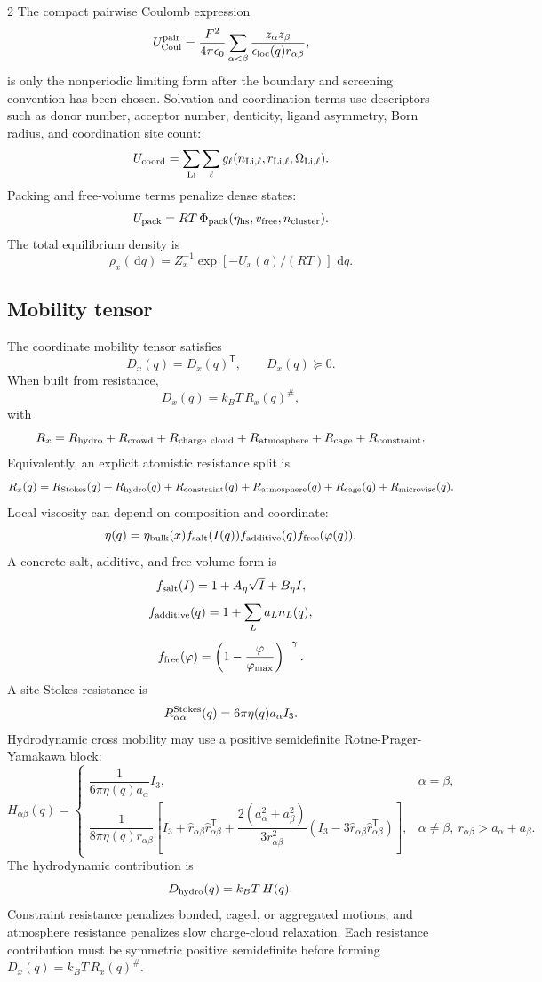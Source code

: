\documentclass[10pt]{article}
\newcommand{\dd}{\,\mathrm d}
\newcommand{\T}{\mathsf{T}}
\begin{document}
\begin{multicols}{2}
The compact pairwise Coulomb expression
\[
U_{\rm Coul}^{\rm pair}
=
\frac{F^2}{4\pi\epsilon_0}
\sum_{\alpha<\beta}
\frac{z_\alpha z_\beta}{\epsilon_{\rm loc}(q)r_{\alpha\beta}},
\]
is only the nonperiodic limiting form after the boundary and screening
convention has been chosen.
Solvation and coordination terms use descriptors such as donor number,
acceptor number, denticity, ligand asymmetry, Born radius, and coordination
site count:
\[
U_{\rm coord}
=
\sum_{\rm Li}\sum_{\ell}
g_\ell(n_{\rm Li,\ell},r_{\rm Li,\ell},\Omega_{\rm Li,\ell}).
\]
Packing and free-volume terms penalize dense states:
\[
U_{\rm pack}=RT\,\Phi_{\rm pack}(\eta_{\rm hs},v_{\rm free},n_{\rm cluster}).
\]
The total equilibrium density is
\[
\rho_x(\dd q)
=
Z_x^{-1}\exp[-U_x(q)/(RT)]\,\dd q.
\]

\subsection{Mobility tensor}
\label{sec:mobility}

The coordinate mobility tensor satisfies
\[
D_x(q)=D_x(q)^\T,\qquad D_x(q)\succeq0.
\]
When built from resistance,
\[
D_x(q)=k_BT\,R_x(q)^\#,
\]
with
\[
R_x=
R_{\rm hydro}
+
R_{\rm crowd}
+
R_{\rm charge\ cloud}
+
R_{\rm atmosphere}
+
R_{\rm cage}
+
R_{\rm constraint}.
\]
Equivalently, an explicit atomistic resistance split is
\[
R_x(q)
=
R_{\rm Stokes}(q)
+
R_{\rm hydro}(q)
+
R_{\rm constraint}(q)
+
R_{\rm atmosphere}(q)
+
R_{\rm cage}(q)
+
R_{\rm microvisc}(q).
\]
Local viscosity can depend on composition and coordinate:
\[
\eta(q)
=
\eta_{\rm bulk}(x)
f_{\rm salt}(I(q))
f_{\rm additive}(q)
f_{\rm free}( \varphi(q)).
\]
A concrete salt, additive, and free-volume form is
\[
f_{\rm salt}(I)
=
1+A_\eta\sqrt I+B_\eta I,
\]
\[
f_{\rm additive}(q)
=
1+\sum_L a_L n_L(q),
\]
\[
f_{\rm free}(\varphi)
=
\left(1-\frac{\varphi}{\varphi_{\max}}\right)^{-\gamma}.
\]
A site Stokes resistance is
\[
R_{\alpha\alpha}^{\rm Stokes}(q)
=
6\pi\eta(q)a_\alpha I_3.
\]
Hydrodynamic cross mobility may use a positive semidefinite Rotne-Prager-Yamakawa
block:
\[
H_{\alpha\beta}(q)
=
\begin{cases}
\dfrac{1}{6\pi\eta(q)a_\alpha}I_3,
& \alpha=\beta,\\[7pt]
\dfrac{1}{8\pi\eta(q)r_{\alpha\beta}}
\left[
I_3+\hat r_{\alpha\beta}\hat r_{\alpha\beta}^{\T}
+
\dfrac{2(a_\alpha^2+a_\beta^2)}{3r_{\alpha\beta}^2}
\left(
I_3-3\hat r_{\alpha\beta}\hat r_{\alpha\beta}^{\T}
\right)
\right],
& \alpha\ne\beta,\ r_{\alpha\beta}>a_\alpha+a_\beta.
\end{cases}
\]
The hydrodynamic contribution is
\[
D_{\rm hydro}(q)=k_BT\,H(q).
\]
Constraint resistance penalizes bonded, caged, or aggregated motions, and
atmosphere resistance penalizes slow charge-cloud relaxation. Each resistance
contribution must be symmetric positive semidefinite before forming
\(D_x(q)=k_BT\,R_x(q)^\#\).


\end{multicols}
\end{document}
